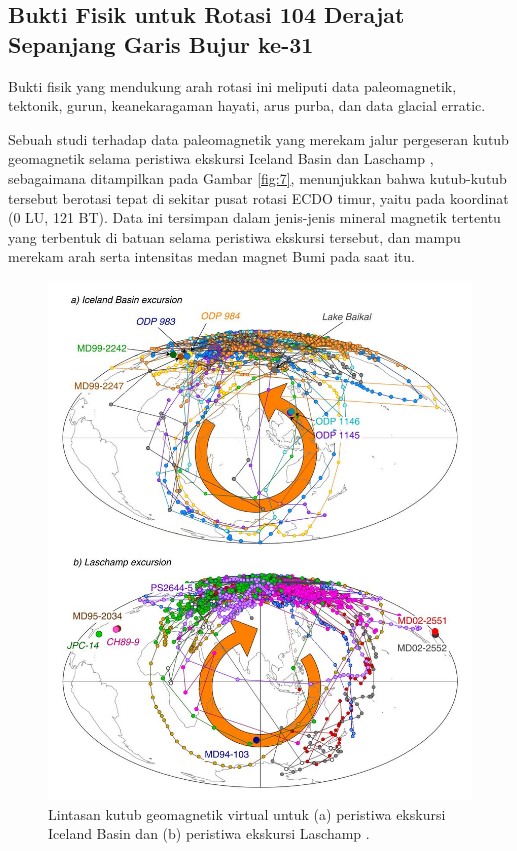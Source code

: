\documentclass[10pt,twocolumn,letterpaper]{article}
\begin{document}
\subsection{Bukti Fisik untuk Rotasi 104 Derajat Sepanjang Garis Bujur ke-31}

Bukti fisik yang mendukung arah rotasi ini meliputi data paleomagnetik, tektonik, gurun, keanekaragaman hayati, arus purba, dan data glacial erratic.

Sebuah studi terhadap data paleomagnetik yang merekam jalur pergeseran kutub geomagnetik selama peristiwa ekskursi Iceland Basin dan Laschamp \cite{35}, sebagaimana ditampilkan pada Gambar \ref{fig:7}, menunjukkan bahwa kutub-kutub tersebut berotasi tepat di sekitar pusat rotasi ECDO timur, yaitu pada koordinat (0 LU, 121 BT). Data ini tersimpan dalam jenis-jenis mineral magnetik tertentu yang terbentuk di batuan selama peristiwa ekskursi tersebut, dan mampu merekam arah serta intensitas medan magnet Bumi pada saat itu.
\begin{figure}[t]
\begin{center}
   \includegraphics[width=0.95\linewidth]{laj.jpg}
\end{center}
   \caption{Lintasan kutub geomagnetik virtual untuk (a) peristiwa ekskursi Iceland Basin dan (b) peristiwa ekskursi Laschamp \cite{35}.}
\label{fig:7}
\label{fig:onecol}
\end{figure}
\end{document}
